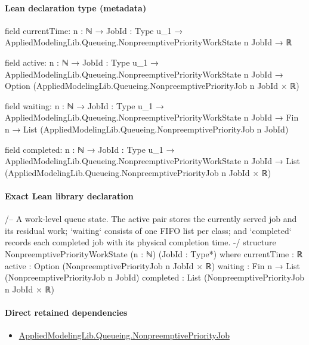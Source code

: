 \documentclass[10pt]{article}
\begin{document}
\paragraph{Lean declaration type (metadata)}
\begin{ReviewVerbatim}
field currentTime:
{n : ℕ} → {JobId : Type u_1} → AppliedModelingLib.Queueing.NonpreemptivePriorityWorkState n JobId → ℝ

field active:
{n : ℕ} →
  {JobId : Type u_1} →
    AppliedModelingLib.Queueing.NonpreemptivePriorityWorkState n JobId →
      Option (AppliedModelingLib.Queueing.NonpreemptivePriorityJob n JobId × ℝ)

field waiting:
{n : ℕ} →
  {JobId : Type u_1} →
    AppliedModelingLib.Queueing.NonpreemptivePriorityWorkState n JobId →
      Fin n → List (AppliedModelingLib.Queueing.NonpreemptivePriorityJob n JobId)

field completed:
{n : ℕ} →
  {JobId : Type u_1} →
    AppliedModelingLib.Queueing.NonpreemptivePriorityWorkState n JobId →
      List (AppliedModelingLib.Queueing.NonpreemptivePriorityJob n JobId × ℝ)
\end{ReviewVerbatim}

\paragraph{Exact Lean library declaration}
\begin{ReviewVerbatim}
/-- A work-level queue state.  The active pair stores the currently served
job and its residual work; `waiting` consists of one FIFO list per class; and
`completed` records each completed job with its physical completion time. -/
structure NonpreemptivePriorityWorkState (n : ℕ) (JobId : Type*) where
  currentTime : ℝ
  active : Option (NonpreemptivePriorityJob n JobId × ℝ)
  waiting : Fin n → List (NonpreemptivePriorityJob n JobId)
  completed : List (NonpreemptivePriorityJob n JobId × ℝ)
\end{ReviewVerbatim}

\paragraph{Direct retained dependencies}
\begin{itemize}\raggedright
\item \hyperlink{library-prerequisite-2373fe691c32d999}{Applied\allowbreak{}Modeling\allowbreak{}Lib.\allowbreak{}Queueing.\allowbreak{}Nonpreemptive\allowbreak{}Priority\allowbreak{}Job}
\end{itemize}
\end{document}

